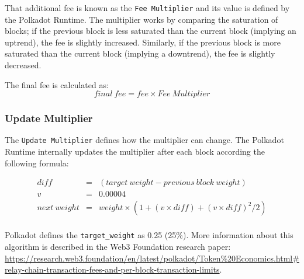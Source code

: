 \documentclass[11pt,a4paper]{article}
\begin{document}
That additional fee is known as the \verb|Fee Multiplier| and its value is defined
by the Polkadot Runtime. The multiplier works by comparing the saturation of blocks; if the previous 
block is less saturated than the current block (implying an uptrend), the fee is slightly increased.
Similarly, if the previous block is more saturated than the current block (implying a downtrend), the
fee is slightly decreased.
\newline

The final fee is calculated as:
$$
      final\ fee = fee \times Fee\ Multiplier
$$

\subsubsection{Update Multiplier}
The \verb|Update Multiplier| defines how the multiplier can change. The Polkadot Runtime internally
updates the multiplier after each block according the following formula:

\begin{eqnarray*}
diff &=& (target\ weight - previous\ block\ weight)\\
v &=& 0.00004\\
next\ weight &=& weight \times (1 + (v \times diff) + (v \times diff)^2 / 2)\\
\end{eqnarray*}

Polkadot defines the \verb|target_weight| as 0.25 (25\%). More information about this algorithm is described
in the Web3 Foundation research paper: \url{https://research.web3.foundation/en/latest/polkadot/Token%20Economics.html#relay-chain-transaction-fees-and-per-block-transaction-limits}.
\end{document}
